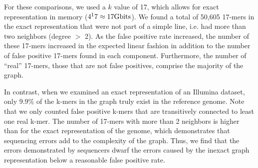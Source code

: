 \documentclass[12pt]{article} \usepackage{simplemargins}
\begin{document}
\begin{table}
\caption{An exact \emph{E. coli} genome representation of 17-mers was compared with 
two inexact ones as well as an exact and two inexact representations of an Illumina 
\emph{E. coli} dataset.}
\end{table}

For these comparisons, we used a $k$ value of 17, which allows for exact
representation in memory ($4^17 \approx 17 {\rm Gbits}$). We found 
a total of 50,605 17-mers in the exact representation that were not
part of a simple line, i.e. had more 
than two neighbors (degree $>$ 2). As the false positive rate 
increased, the number of these 
17-mers increased in the expected linear fashion in addition to the number of 
false positive 17-mers found in each component. Furthermore, the number of 
``real'' 17-mers, those that are not false positives, 
comprise the majority of the graph.

In contrast, when we examined an exact representation of an Illumina
dataset, only 9.9\% of the k-mers in the graph truly exist in the
reference genome. Note that we only counted false positive k-mers that
are transitively connected to least one real k-mer. The
number of 17-mers with more than 2 neighbors is higher
than for the exact representation of the genome, which demonstrates
that sequencing errors add to the complexity of the
graph. Thus, we find that the errors demonstrated by sequencers dwarf
the errors caused by the inexact graph representation below a
reasonable false positive rate.
\end{document}
